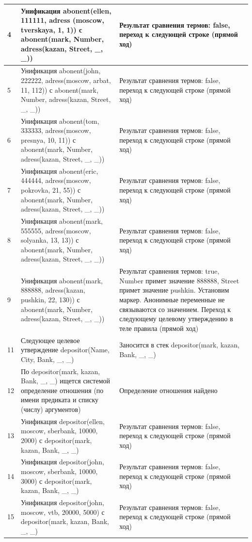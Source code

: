 \documentclass[a4paper,14pt]{extreport} %
\begin{document}
\begin{longtable}{|p{1.1cm}|p{8.5cm}|p{7cm}|}
	4 & Унификация abonent(ellen, 111111, adress (moscow, tverskaya, 1, 1)) с abonent(mark, Number, adress(kazan, Street, \_, \_)) & Результат сравнения термов: false, переход к следующей строке (прямой ход) \\ \hline
	5 & Унификация abonent(john, 222222, adress(moscow, arbat, 11, 112)) с abonent(mark, Number, adress(kazan, Street, \_, \_)) & Результат сравнения термов: false, переход к следующей строке (прямой ход) \\ \hline
	6 & Унификация abonent(tom, 333333, adress(moscow, presnya, 10, 11)) с abonent(mark, Number, adress(kazan, Street, \_, \_)) & Результат сравнения термов: false, переход к следующей строке (прямой ход) \\ \hline
	7 & Унификация abonent(eric, 444444, adress(moscow, pokrovka, 21, 55)) с abonent(mark, Number, adress(kazan, Street, \_, \_)) & Результат сравнения термов: false, переход к следующей строке (прямой ход) \\ \hline
	8 & Унификация abonent(mark, 555555, adress(moscow, solyanka, 13, 13)) с abonent(mark, Number, adress(kazan, Street, \_, \_))& Результат сравнения термов: false, переход к следующей строке (прямой ход) \\ \hline
	9 & Унификация abonent(mark, 888888, adress(kazan, pushkin, 22, 130)) с abonent(mark, Number, adress(kazan, Street, \_, \_))& Результат сравнения термов: true, Number примет значение 888888, Street примет значение pushkin. Установим маркер.  Анонимные переменные не связываются со значением. Переход к следующему целевому утверждению в теле правила (прямой ход) \\ \hline
	11 & Следующее целевое утверждение depositor(Name, City, Bank, \_, \_) & Заносится в стек depositor(mark, kazan, Bank, \_, \_)   \\ \hline
	12 & По depositor(mark, kazan, Bank, \_, \_) ищется системой определение отношения (по имени предиката и списку (числу) аргументов) & Определение отношения найдено \\ \hline
	13 & Унификация depositor(ellen, moscow, sberbank, 10000, 2000) с depositor(mark, kazan, Bank, \_, \_) & Результат сравнения термов: false, переход к следующей строке (прямой ход) \\ \hline
	14 & Унификация depositor(john, moscow, sberbank, 10000, 3000) с depositor(mark, kazan, Bank, \_, \_) & Результат сравнения термов: false, переход к следующей строке (прямой ход) \\ \hline
	15 & Унификация depositor(john, moscow, vtb, 20000, 5000) с depositor(mark, kazan, Bank, \_, \_) & Результат сравнения термов: false, переход к следующей строке (прямой ход) \\ \hline

\end{longtable}
\end{document}

